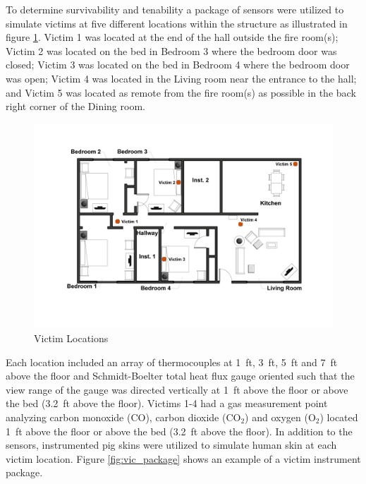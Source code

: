 \documentclass[12pt,oneside]{book}
\begin{document}


To determine survivability and tenability a package of sensors were utilized to simulate victims at five different locations within the structure as illustrated in figure \ref{fig:vic_loc}. Victim 1 was located at the end of the hall outside the fire room(s); Victim 2 was located on the bed in Bedroom 3 where the bedroom door was closed; Victim 3 was located on the bed in Bedroom 4 where the bedroom door was open; Victim 4 was located in the Living room near the entrance to the hall; and Victim 5 was located as remote from the fire room(s) as possible in the back right corner of the Dining room. 

\begin{figure}[H]
	\centering
	\includegraphics[width=\textwidth]{../0_Images/Instrumentation/Victim_Locations}
	\caption{Victim Locations}
	\label{fig:vic_loc}
\end{figure}

Each location included an array of thermocouples at 1~ft, 3~ft, 5~ft and 7~ft above the floor and Schmidt-Boelter total heat flux gauge oriented such that the view range of the gauge was directed vertically at 1~ft above the floor or above the bed (3.2~ft above the floor). Victims 1-4 had a gas measurement point analyzing carbon monoxide (CO), carbon dioxide (CO$_{2}$) and oxygen (O$_{2}$) located 1~ft above the floor or above the bed (3.2~ft above the floor). In addition to the sensors, instrumented pig skins were utilized to simulate human skin at each victim location. Figure \ref{fig:vic_package} shows an example of a victim instrument package. 
\end{document}
